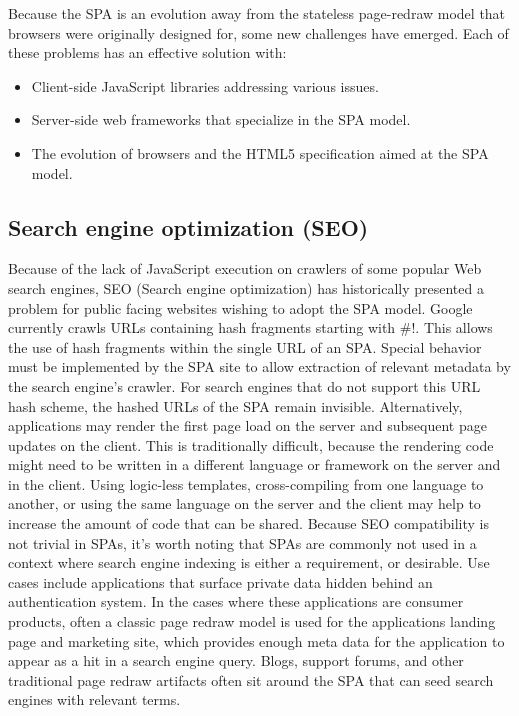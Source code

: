 Because the SPA is an evolution away from the stateless page-redraw model that browsers were originally designed for, some new challenges have emerged. Each of these problems has an effective solution with:
\begin{itemize}
\item Client-side JavaScript libraries addressing various issues.
\item Server-side web frameworks that specialize in the SPA model.
\item The evolution of browsers and the HTML5 specification aimed at the SPA model.
\end{itemize}

\subsection{Search engine optimization (SEO)}
\label{subsec:arc_over_seo}
Because of the lack of JavaScript execution on crawlers of some popular Web search engines, SEO (Search engine optimization) has historically presented a problem for public facing websites wishing to adopt the SPA model.
Google currently crawls URLs containing hash fragments starting with \#!. This allows the use of hash fragments within the single URL of an SPA. Special behavior must be implemented by the SPA site to allow extraction of relevant metadata by the search engine's crawler. For search engines that do not support this URL hash scheme, the hashed URLs of the SPA remain invisible.
Alternatively, applications may render the first page load on the server and subsequent page updates on the client. This is traditionally difficult, because the rendering code might need to be written in a different language or framework on the server and in the client. Using logic-less templates, cross-compiling from one language to another, or using the same language on the server and the client may help to increase the amount of code that can be shared.
Because SEO compatibility is not trivial in SPAs, it's worth noting that SPAs are commonly not used in a context where search engine indexing is either a requirement, or desirable. Use cases include applications that surface private data hidden behind an authentication system. In the cases where these applications are consumer products, often a classic page redraw model is used for the applications landing page and marketing site, which provides enough meta data for the application to appear as a hit in a search engine query. Blogs, support forums, and other traditional page redraw artifacts often sit around the SPA that can seed search engines with relevant terms.

